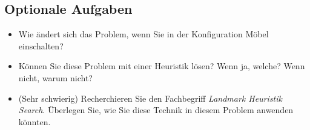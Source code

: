 \documentclass[a4paper,11pt,german,notitlepage]{report}
\begin{document}
\subsection*{Optionale Aufgaben}
\begin{itemize}
    \item Wie ändert sich das Problem, wenn Sie in der Konfiguration Möbel einschalten?
    \item Können Sie diese Problem mit einer Heuristik lösen? Wenn ja, welche? Wenn nicht, warum nicht?
    \item (Sehr schwierig) Recherchieren Sie den Fachbegriff \textit{Landmark Heuristik Search}. Überlegen Sie, wie Sie diese Technik in diesem Problem anwenden könnten.
\end{itemize}
\end{document}
